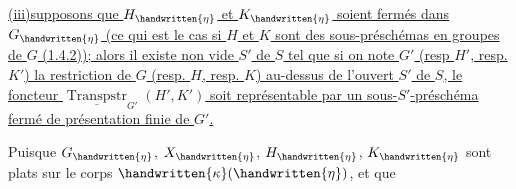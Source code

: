 \uline{(iii)supposons que $H_{\handwritten{\eta}}$ et $K_{\handwritten{\eta}}$ soient fermés dans $G_{\handwritten{\eta}}$ (ce qui est le cas si $H$ et $K$ sont des sous-préschémas en groupes de $G$ (1.4.2)); alors il existe  non vide $S'$ de $S$ tel que si on note $G'$ (resp $H'$, resp. $K'$) la restriction de $G$ (resp. $H$, resp. $K$) au-dessus de l'ouvert $S'$ de $S$, le foncteur $\underline{\operatorname{Transpstr}}_{G'}(H',K')$ soit représentable par un sous-$S'$-préschéma fermé de présentation finie de $G'$.}

Puisque $G_{\handwritten{\eta}}$, $X_{\handwritten{\eta}}$, $H_{\handwritten{\eta}}$, $K_{\handwritten{\eta}}$ sont plats sur le corps $\handwritten{\kappa}(\handwritten{\eta})$, et que
